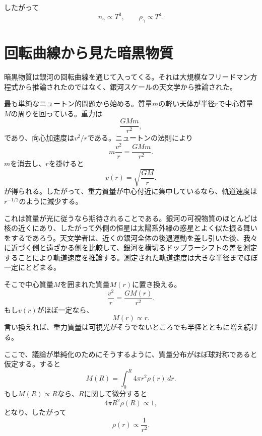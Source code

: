 したがって
\begin{equation}
n_\gamma\propto T^3,
\qquad
\rho_\gamma\propto T^4.
\end{equation}

\section{回転曲線から見た暗黒物質}

暗黒物質は銀河の回転曲線を通じて入ってくる。それは大規模なフリードマン方程式から推論されたのではなく、銀河スケールの天文学から推論された。

最も単純なニュートン的問題から始める。質量\(m\)の軽い天体が半径\(r\)で中心質量\(M\)の周りを回っている。重力は
\begin{equation}
\frac{GMm}{r^2},
\end{equation}
であり、向心加速度は\(v^2/r\)である。ニュートンの法則により
\begin{equation}
m\frac{v^2}{r}=\frac{GMm}{r^2}.
\end{equation}
\(m\)を消去し、\(r\)を掛けると
\begin{equation}
v(r)=\sqrt{\frac{GM}{r}}.
\end{equation}
が得られる。したがって、重力質量が中心付近に集中しているなら、軌道速度は\(r^{-1/2}\)のように減少する。

これは質量が光に従うなら期待されることである。銀河の可視物質のほとんどは核の近くにあり、したがって外側の恒星は太陽系外縁の惑星とよく似た振る舞いをするであろう。天文学者は、近くの銀河全体の後退運動を差し引いた後、我々に近づく側と遠ざかる側を比較して、銀河を横切るドップラーシフトの差を測定することにより軌道速度を推論する。測定された軌道速度は大きな半径までほぼ一定にとどまる。

そこで中心質量\(M\)を囲まれた質量\(M(r)\)に置き換える。
\begin{equation}
\frac{v^2}{r}=\frac{G M(r)}{r^2}.
\end{equation}
もし\(v(r)\)がほぼ一定なら、
\begin{equation}
M(r)\propto r.
\end{equation}
言い換えれば、重力質量は可視光がそうでないところでも半径とともに増え続ける。

ここで、議論が単純化のためにそうするように、質量分布がほぼ球対称であると仮定する。すると
\begin{equation}
M(R)=\int_0^R 4\pi r^2\rho(r)\,dr.
\end{equation}
もし\(M(R)\propto R\)なら、\(R\)に関して微分すると
\begin{equation}
4\pi R^2\rho(R)\propto 1,
\end{equation}
となり、したがって
\begin{equation}
\rho(r)\propto \frac{1}{r^2}.
\end{equation}

